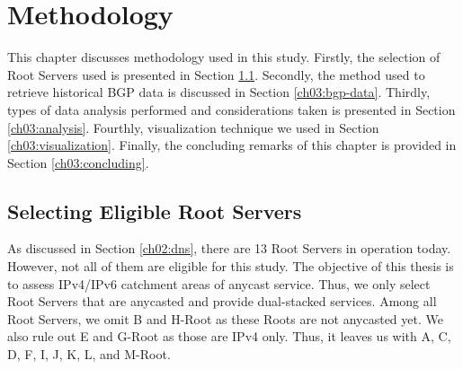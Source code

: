 \chapter{Methodology}
\label{ch03}
This chapter discusses methodology used in this study. Firstly, the selection of Root Servers used is presented in Section \ref{ch03:root-server}. Secondly, the method used to retrieve historical BGP data is discussed in Section \ref{ch03:bgp-data}. Thirdly, types of data analysis performed and considerations taken is presented in Section \ref{ch03:analysis}.  Fourthly, visualization technique we used in Section \ref{ch03:visualization}. Finally, the concluding remarks of this chapter is provided in Section \ref{ch03:concluding}.

\section{Selecting Eligible Root Servers}
\label{ch03:root-server}
As discussed in Section \ref{ch02:dns}, there are 13 Root Servers in operation today. However, not all of them are eligible for this study. The objective of this thesis is to assess IPv4/IPv6 catchment areas of anycast service. Thus, we only select Root Servers that are anycasted and provide dual-stacked services. Among all Root Servers, we omit B and H-Root as these Roots are not anycasted yet. We also rule out E and G-Root as those are IPv4 only. Thus, it leaves us with A, C, D, F, I, J, K, L, and M-Root.


